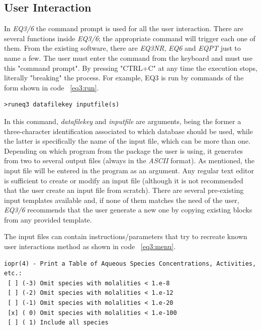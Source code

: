 \subsection{User Interaction}
In \emph{EQ3/6} the command prompt is used for all the user interaction. There are several functions inside \emph{EQ3/6}; the appropriate command will trigger each one of them. From the existing software, there are \emph{EQ3NR}, \emph{EQ6} and \emph{EQPT} just to name a few. The user must enter the command from the keyboard and must use this "command prompt". By pressing "CTRL+C" at any time the execution stops, literally "breaking" the process. For example, EQ3 is run by commands of the form shown in code ~\ref{eq3:run}.

\begin{lstlisting}[frame=single, caption=Running EQ3 in \emph{EQ3/6} package, label=eq3:run]
>runeq3 datafilekey inputfile(s)
\end{lstlisting}

In this command, \emph{datafilekey} and \emph{inputfile} are arguments, being the former a three-character identification associated to which database should be used, while the latter is specifically the name of the input file, which can be more than one. Depending on which program from the package the user is using, it generates from two to several output files (always in the \emph{ASCII} format).
As mentioned, the input file will be entered in the program as an argument. Any regular text editor is sufficient to create or modify an input file (although it is not recommended that the user create an input file from scratch). There are several pre-existing input templates available and, if none of them matches the need of the user, \emph{EQ3/6} recommends that the user generate a new one by copying existing blocks from any provided template.

The input files can contain instructions/parameters that try to recreate known user interactions method as shown in code ~\ref{eq3:menu}.

\begin{minipage}[c]{0.92\textwidth}
\begin{lstlisting}[frame=single, caption=Menu Option inside \emph{EQ3/6} input files that mimics a "radio button", label=eq3:menu]
iopr(4) - Print a Table of Aqueous Species Concentrations, Activities, etc.: 
 [ ] (-3) Omit species with molalities < 1.e-8 
 [ ] (-2) Omit species with molalities < 1.e-12 
 [ ] (-1) Omit species with molalities < 1.e-20 
 [x] ( 0) Omit species with molalities < 1.e-100 
 [ ] ( 1) Include all species 
\end{lstlisting}
\end{minipage}

